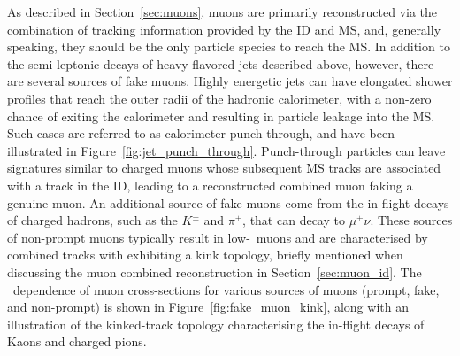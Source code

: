 As described in Section~\ref{sec:muons}, muons are primarily reconstructed via the combination
of tracking information provided by the ID and MS, and, generally speaking, they should be the only particle species to reach
the MS.
In addition to the semi-leptonic decays of heavy-flavored jets described above, however,
there are several sources of fake muons.
Highly energetic jets can have elongated shower profiles that reach the outer
radii of the hadronic calorimeter, with a non-zero chance of exiting the calorimeter
and resulting in particle leakage into the MS.
Such cases are referred to as calorimeter punch-through, and have been illustrated
in Figure~\ref{fig:jet_punch_through}.
Punch-through particles can leave signatures similar to charged muons whose subsequent
MS tracks are associated with a track in the ID, leading to a reconstructed combined muon
faking a genuine muon.
An additional source of fake muons come from the in-flight decays of charged hadrons,
such as the $K^\pm$ and $\pi^{\pm}$, that can decay to $\mu^{\pm} \nu$.
These sources of non-prompt muons typically result in low-\pT~muons and are characterised
by combined tracks with exhibiting a kink topology,
briefly mentioned when discussing the muon combined reconstruction in Section~\ref{sec:muon_id}.
The \pT~dependence of muon cross-sections for various sources of muons (prompt, fake, and non-prompt)
is shown in Figure~\ref{fig:fake_muon_kink}, along with an illustration of the kinked-track topology
characterising the in-flight decays of Kaons and charged pions.

